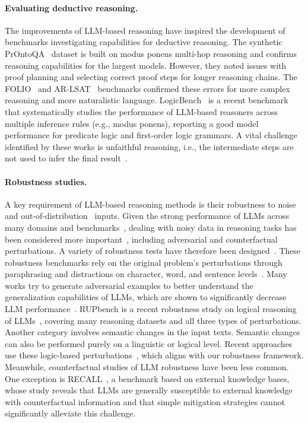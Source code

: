 \paragraph{Evaluating deductive reasoning.} The improvements of \ac{LLM}-based reasoning have inspired the development of benchmarks investigating capabilities for deductive reasoning. 
The synthetic PrOntoQA~\cite{saparov_language_2022} dataset is built on modus ponens multi-hop reasoning and confirms reasoning capabilities for the largest models. 
However, they noted issues with proof planning and selecting correct proof steps for longer reasoning chains. 
The FOLIO~\cite{han_folio_2022} and AR-LSAT~\cite{zhong_analytical_2022} benchmarks confirmed these errors for more complex reasoning and more naturalistic language. 
LogicBench~\cite{mihir_parmar_logicbench_2023} is a recent benchmark that systematically studies the performance of \ac{LLM}-based reasoners across multiple inference rules (e.g., modus ponens), reporting a good model performance for predicate logic and first-order logic grammars.
A vital challenge identified by these works is unfaithful reasoning, i.e., the intermediate steps are not used to infer the final result~\cite{ye_unreliability_2022,lanham_measuring_2023,tanneru_difficulty_2024}. 


\paragraph{Robustness studies.}
A key requirement of \ac{LLM}-based reasoning methods is their robustness to noise~\cite{ebrahimi-etal-2018-hotflip} and out-of-distribution~\cite{hendrycks2021measuring} inputs. Given the strong performance of \acp{LLM} across many domains and benchmarks~\cite{sarlin2020superglue}, dealing with noisy data in reasoning tasks has been considered more important~\cite{sourati-etal-2024-robust}, including adversarial and counterfactual perturbations.
A variety of robustness tests have therefore been designed~\cite{wang_measure_2022}. 
These robustness benchmarks rely on the original problem's perturbations through paraphrasing and distractions on character, word, and sentence levels~\cite{sourati-etal-2024-robust,sarlin2020superglue}. 
Many works try to generate adversarial examples to better understand the generalization capabilities of \acp{LLM}, which are shown to significantly decrease \ac{LLM} performance~\cite{wang_measure_2022}.
RUPbench is a recent robustness study on logical reasoning of \acp{LLM}~\cite{wang_rupbench_2024}, covering many reasoning datasets and all three types of perturbations.
Another category involves semantic changes in the input texts. 
Semantic changes can also be performed purely on a linguistic or logical level.
Recent approaches use these logic-based perturbations~\cite{nakamura-etal-2023-logicattack}, which aligns with our robustness framework. Meanwhile, counterfactual studies of \ac{LLM} robustness have been less common. One exception is RECALL~\cite{liu2023recall}, a benchmark based on external knowledge bases, whose study reveals that \acp{LLM} are generally susceptible to external knowledge with counterfactual information and that simple mitigation strategies cannot significantly alleviate this challenge.

